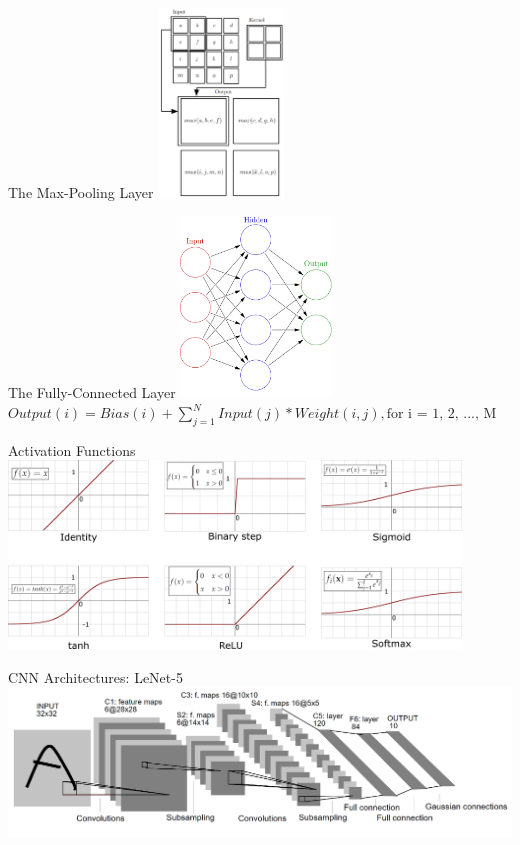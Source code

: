 \begin{frame}{The Max-Pooling Layer}
	\centering
	\includegraphics[width=0.25\textwidth]{../Images/CNNArchitectures/maxpooling-operation.png}\\
\end{frame}

\begin{frame}{The Fully-Connected Layer}
	\centering
	\includegraphics[width=0.3\textwidth]{../Images/CNNArchitectures/simplified-neural-network-graph.png}\\
	$Output(i) = Bias(i) + \sum_{j = 1}^{N} Input(j) * Weight(i, j), \mbox{for i = 1, 2, ..., M}$
\end{frame}

\begin{frame}{Activation Functions}
	\centering
	\includegraphics[width=0.9\textwidth]{../Images/CNNArchitectures/Activation_functions.png}\\
\end{frame}

\begin{frame}{CNN Architectures: LeNet-5}
	\centering
	\includegraphics[width=\textwidth]{../Images/CNNArchitectures/LeNet-5.png}\\
\end{frame}

